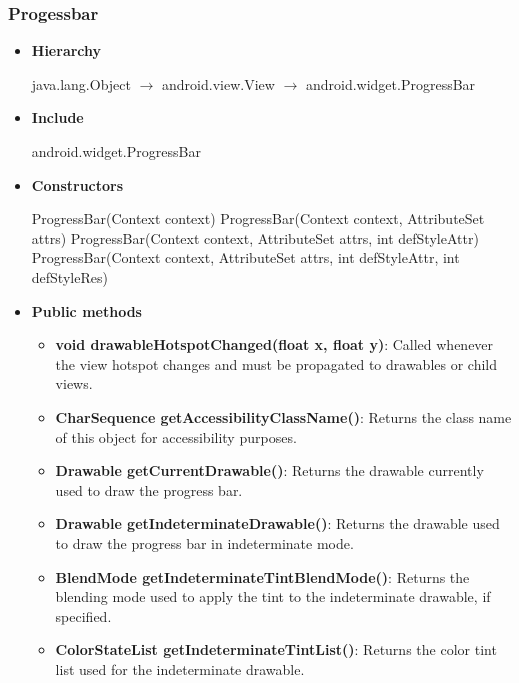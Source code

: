 \documentclass{report}
\begin{document}
    \pagebreak 
    \subsubsection{Progessbar}
    \begin{itemize}
        \item \textbf{Hierarchy} 
            \begin{center}
                java.lang.Object $\to$	android.view.View $\to$	android.widget.ProgressBar
            \end{center}
        \item \textbf{Include}
            \bigbreak \noindent 
            \begin{javacode}
                android.widget.ProgressBar
            \end{javacode}
        \item \textbf{Constructors}
            \bigbreak \noindent 
            \begin{javacode}
                ProgressBar(Context context)
                ProgressBar(Context context, AttributeSet attrs)
                ProgressBar(Context context, AttributeSet attrs, int defStyleAttr)
                ProgressBar(Context context, AttributeSet attrs, int defStyleAttr, int defStyleRes)
            \end{javacode}
        \item \textbf{Public methods}
            \begin{itemize}
                \item \textbf{void drawableHotspotChanged(float x, float y)}: Called whenever the view hotspot changes and must be propagated to drawables or child views.
                \item \textbf{CharSequence getAccessibilityClassName()}: Returns the class name of this object for accessibility purposes.
                \item \textbf{Drawable getCurrentDrawable()}: Returns the drawable currently used to draw the progress bar.
                \item \textbf{Drawable getIndeterminateDrawable()}: Returns the drawable used to draw the progress bar in indeterminate mode.
                \item \textbf{BlendMode getIndeterminateTintBlendMode()}: Returns the blending mode used to apply the tint to the indeterminate drawable, if specified.
                \item \textbf{ColorStateList getIndeterminateTintList()}: Returns the color tint list used for the indeterminate drawable.

\end{itemize}
\end{itemize}
\end{document}
